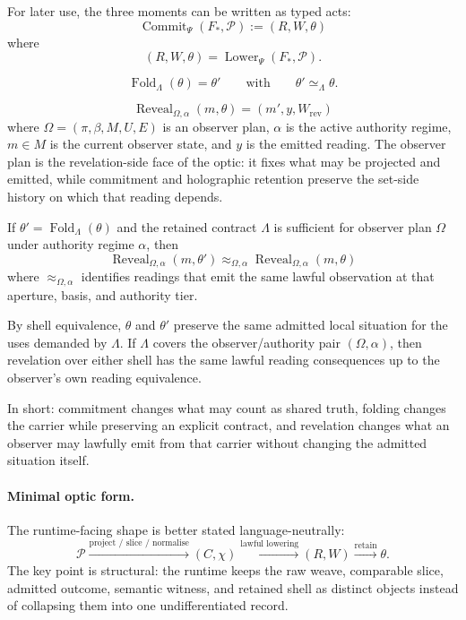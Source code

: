 \documentclass{aion}
\begin{document}
For later use, the three moments can be written as typed acts:
\[
	\operatorname{Commit}_{\Psi}(F_*, \mathcal{P})
	:=
	(R,W,\theta)
\]
where
\[
	(R,W,\theta) = \operatorname{Lower}_{\Psi}(F_*, \mathcal{P}).
\]

\[
	\operatorname{Fold}_{\Lambda}(\theta) = \theta'
	\qquad
	\text{with}
	\qquad
	\theta' \simeq_{\Lambda} \theta.
\]

\[
	\operatorname{Reveal}_{\Omega,\alpha}(m,\theta)
	=
	(m', y, W_{\mathrm{rev}})
\]
where \(\Omega = (\pi,\beta,M,U,E)\) is an observer plan, \(\alpha\) is
the active authority regime, \(m \in M\) is the current observer state, and
\(y\) is the emitted reading. The observer plan is the revelation-side face of
the optic: it fixes what may be projected and emitted, while commitment and
holographic retention preserve the set-side history on which that reading
depends.

\begin{proposition}
	If \(\theta' = \operatorname{Fold}_{\Lambda}(\theta)\) and the retained
	contract \(\Lambda\) is sufficient for observer plan \(\Omega\) under authority
	regime \(\alpha\), then
	\[
		\operatorname{Reveal}_{\Omega,\alpha}(m,\theta')
		\approx_{\Omega,\alpha}
		\operatorname{Reveal}_{\Omega,\alpha}(m,\theta)
	\]
	where \(\approx_{\Omega,\alpha}\) identifies readings that emit the same lawful
	observation at that aperture, basis, and authority tier.
\end{proposition}

\begin{argument}
	By shell equivalence, \(\theta\) and \(\theta'\) preserve the same admitted
	local situation for the uses demanded by \(\Lambda\). If \(\Lambda\) covers the
	observer/authority pair \((\Omega,\alpha)\), then revelation over either shell
	has the same lawful reading consequences up to the observer's own reading
	equivalence.
\end{argument}

In short: commitment changes what may count as shared truth, folding changes
the carrier while preserving an explicit contract, and revelation changes what
an observer may lawfully emit from that carrier without changing the admitted
situation itself.

\paragraph{Minimal optic form.}
The runtime-facing shape is better stated language-neutrally:
\[
	\mathcal{P}
	\xrightarrow{\text{project / slice / normalise}}
	(C,\chi)
	\xrightarrow{\text{lawful lowering}}
	(R,W)
	\xrightarrow{\text{retain}}
	\theta .
\]
The key point is structural: the runtime keeps the raw weave, comparable slice,
admitted outcome, semantic witness, and retained shell as distinct objects
instead of collapsing them into one undifferentiated record.
\end{document}
